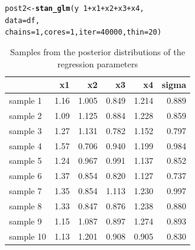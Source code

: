 \documentclass[11pt,a4paper,twoside]{book}\usepackage[]{graphicx}\usepackage[]{color}
\makeatletter
\newcommand{\hlnum}[1]{\textcolor[rgb]{0.686,0.059,0.569}{#1}}%
\newcommand{\hlopt}[1]{\textcolor[rgb]{0,0,0}{#1}}%
\newcommand{\hlstd}[1]{\textcolor[rgb]{0.345,0.345,0.345}{#1}}%
\newcommand{\hlkwb}[1]{\textcolor[rgb]{0.69,0.353,0.396}{#1}}%
\newcommand{\hlkwc}[1]{\textcolor[rgb]{0.333,0.667,0.333}{#1}}%
\newcommand{\hlkwd}[1]{\textcolor[rgb]{0.737,0.353,0.396}{\textbf{#1}}}%
\newenvironment{kframe}{%
 \def\at@end@of@kframe{}%
 \ifinner\ifhmode%
  \def\at@end@of@kframe{\end{minipage}}%
  \begin{minipage}{\columnwidth}%
 \fi\fi%
 \def\FrameCommand##1{\hskip\@totalleftmargin \hskip-\fboxsep
 \colorbox{shadecolor}{##1}\hskip-\fboxsep
     \hskip-\linewidth \hskip-\@totalleftmargin \hskip\columnwidth}%
 \MakeFramed {\advance\hsize-\width
   \@totalleftmargin\z@ \linewidth\hsize
   \@setminipage}}%
 {\par\unskip\endMakeFramed%
 \at@end@of@kframe}
\newenvironment{knitrout}{}{} %
\makeatother
\begin{document}
\begin{knitrout}
\color{fgcolor}\begin{kframe}
\begin{alltt}
\hlstd{post2} \hlkwb{<-} \hlkwd{stan_glm}\hlstd{(y} \hlopt{~} \hlnum{1} \hlopt{+} \hlstd{x1} \hlopt{+} \hlstd{x2} \hlopt{+} \hlstd{x3} \hlopt{+} \hlstd{x4,}
                  \hlkwc{data} \hlstd{= df,}
                  \hlkwc{chains} \hlstd{=} \hlnum{1}\hlstd{,} \hlkwc{cores} \hlstd{=}\hlnum{1}\hlstd{,} \hlkwc{iter}\hlstd{=}\hlnum{40000}\hlstd{,} \hlkwc{thin}\hlstd{=}\hlnum{20}\hlstd{)}
\end{alltt}
\end{kframe}
\end{knitrout}

\begin{knitrout}
\color{fgcolor}\begin{table}

\caption{\label{tab:simdata.postsample2}Samples from the posterior distributions of the regression parameters}
\centering
\begin{tabular}[t]{lrrrrr}
\toprule
  & x1 & x2 & x3 & x4 & sigma\\
\midrule
sample 1 & 1.16 & 1.005 & 0.849 & 1.214 & 0.889\\
sample 2 & 1.09 & 1.125 & 0.884 & 1.228 & 0.859\\
sample 3 & 1.27 & 1.131 & 0.782 & 1.152 & 0.797\\
sample 4 & 1.57 & 0.706 & 0.940 & 1.199 & 0.984\\
sample 5 & 1.24 & 0.967 & 0.991 & 1.137 & 0.852\\
sample 6 & 1.37 & 0.854 & 0.820 & 1.127 & 0.737\\
sample 7 & 1.35 & 0.854 & 1.113 & 1.230 & 0.997\\
sample 8 & 1.33 & 0.847 & 0.876 & 1.238 & 0.880\\
sample 9 & 1.15 & 1.087 & 0.897 & 1.274 & 0.893\\
sample 10 & 1.13 & 1.201 & 0.908 & 0.905 & 0.830\\
\bottomrule
\end{tabular}
\end{table}


\end{knitrout}
\end{document}
